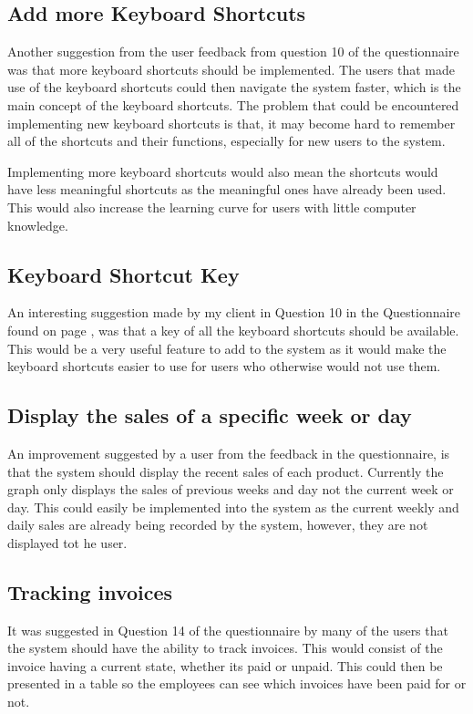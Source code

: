 \subsection{Add more Keyboard Shortcuts}
Another suggestion from the user feedback from question 10 of the questionnaire was that more keyboard shortcuts should be implemented. The users that made use of the keyboard shortcuts could then navigate the system faster, which is the main concept of the keyboard shortcuts. The problem that could be encountered implementing new keyboard shortcuts is that, it may become hard to remember all of the shortcuts and their functions, especially for new users to the system.

Implementing more keyboard shortcuts would also mean the shortcuts would have less meaningful shortcuts as the meaningful ones have already been used. This would also increase the learning curve for users with little computer knowledge.

\subsection{Keyboard Shortcut Key}
An interesting suggestion made by my client in Question 10 in the Questionnaire found on page \pageref{Client-Q1}, was that a key of all the keyboard shortcuts should be available. This would be a very useful feature to add to the system as it would make the keyboard shortcuts easier to use for users who otherwise would not use them.

\subsection {Display the sales of a specific week or day}
An improvement suggested by a user from the feedback in the questionnaire, is that the system should display the recent sales of each product. Currently the graph only displays the sales of previous weeks and day not the current week or day. This could easily be implemented into the system as the current weekly and daily sales are already being recorded by the system, however, they are not displayed tot he user.

\subsection{Tracking invoices}
It was suggested in Question 14 of the questionnaire by many of the users that the system should have the ability to track invoices. This would consist of the invoice having a current state, whether its paid or unpaid. This could then be presented in a table so the employees can see which invoices have been paid for or not.

